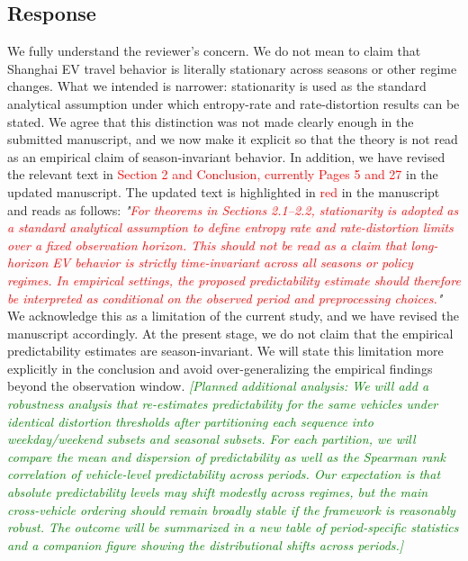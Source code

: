 \documentclass{NSF}
\begin{document}
\subsection{Response}
We fully understand the reviewer's concern. We do not mean to claim that Shanghai EV travel behavior is literally stationary across seasons or other regime changes. What we intended is narrower: stationarity is used as the standard analytical assumption under which entropy-rate and rate-distortion results can be stated. We agree that this distinction was not made clearly enough in the submitted manuscript, and we now make it explicit so that the theory is not read as an empirical claim of season-invariant behavior.
\noindent In addition, we have revised the relevant text in \textcolor{red}{Section 2 and Conclusion, currently Pages 5 and 27} in the updated manuscript. The updated text is highlighted in \textcolor{red}{red} in the manuscript and reads as follows:
\vskip 0.1cm
\noindent \textit{"\textcolor{red}{For theorems in Sections 2.1--2.2, stationarity is adopted as a standard analytical assumption to define entropy rate and rate-distortion limits over a fixed observation horizon. This should not be read as a claim that long-horizon EV behavior is strictly time-invariant across all seasons or policy regimes. In empirical settings, the proposed predictability estimate should therefore be interpreted as conditional on the observed period and preprocessing choices.}"}
\vskip 0.05in
\noindent We acknowledge this as a limitation of the current study, and we have revised the manuscript accordingly. At the present stage, we do not claim that the empirical predictability estimates are season-invariant. We will state this limitation more explicitly in the conclusion and avoid over-generalizing the empirical findings beyond the observation window.
\vskip 0.05in
\noindent\textcolor{green}{\textit{[Planned additional analysis: We will add a robustness analysis that re-estimates predictability for the same vehicles under identical distortion thresholds after partitioning each sequence into weekday/weekend subsets and seasonal subsets. For each partition, we will compare the mean and dispersion of predictability as well as the Spearman rank correlation of vehicle-level predictability across periods. Our expectation is that absolute predictability levels may shift modestly across regimes, but the main cross-vehicle ordering should remain broadly stable if the framework is reasonably robust. The outcome will be summarized in a new table of period-specific statistics and a companion figure showing the distributional shifts across periods.]}}
\end{document}

